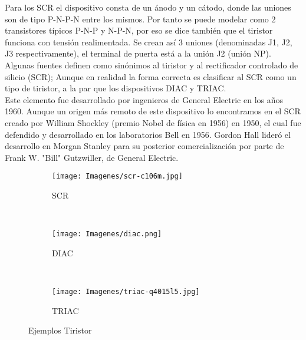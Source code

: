 \documentclass{article}
\begin{document}
Para los SCR el dispositivo consta de un ánodo y un cátodo, donde las uniones son de tipo P-N-P-N entre los mismos. Por tanto se puede modelar como 2 transistores típicos P-N-P y N-P-N, por eso se dice también que el tiristor funciona con tensión realimentada. Se crean así 3 uniones (denominadas J1, J2, J3 respectivamente), el terminal de puerta está a la unión J2 (unión NP).\citep{Tirs}\\

Algunas fuentes definen como sinónimos al tiristor y al rectificador controlado de silicio (SCR); Aunque en realidad la forma correcta es clasificar al SCR como un tipo de tiristor, a la par que los dispositivos DIAC y TRIAC.\citep{Tirs}\\

Este elemento fue desarrollado por ingenieros de General Electric en los años 1960. Aunque un origen más remoto de este dispositivo lo encontramos en el SCR creado por William Shockley (premio Nobel de física en 1956) en 1950, el cual fue defendido y desarrollado en los laboratorios Bell en 1956. Gordon Hall lideró el desarrollo en Morgan Stanley para su posterior comercialización por parte de Frank W. "Bill" Gutzwiller, de General Electric.\citep{Tirs}\\




\begin{figure}[h!]
    \centering
    \begin{subfigure}[b]{0.3\textwidth}
        \texttt{[image: Imagenes/scr-c106m.jpg]}
        \caption{SCR}
        \label{fig:scr}
    \end{subfigure}
    ~ %
    \begin{subfigure}[b]{0.3\textwidth}
        \texttt{[image: Imagenes/diac.png]}
        \caption{DIAC}
        \label{fig:diac}
    \end{subfigure}
    ~ %
    \begin{subfigure}[b]{0.3\textwidth}
        \texttt{[image: Imagenes/triac-q4015l5.jpg]}
        \caption{TRIAC}
        \label{fig:triac}
    \end{subfigure}
    \caption{Ejemplos Tiristor}\label{fig:animals}
\end{figure}
\end{document}
